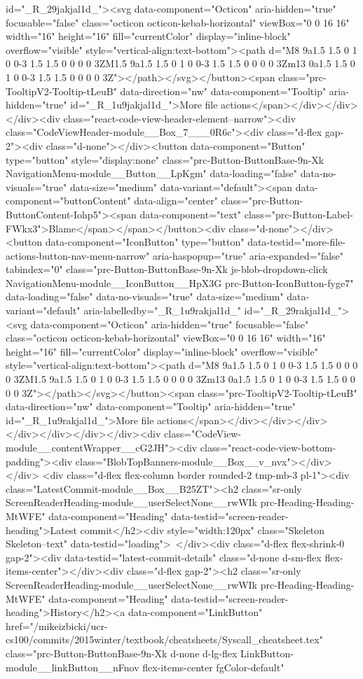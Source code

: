 {{{{{id="_R_29jakjal1d_"><svg data-component="Octicon" aria-hidden="true" focusable="false" class="octicon octicon-kebab-horizontal" viewBox="0 0 16 16" width="16" height="16" fill="currentColor" display="inline-block" overflow="visible" style="vertical-align:text-bottom"><path d="M8 9a1.5 1.5 0 1 0 0-3 1.5 1.5 0 0 0 0 3ZM1.5 9a1.5 1.5 0 1 0 0-3 1.5 1.5 0 0 0 0 3Zm13 0a1.5 1.5 0 1 0 0-3 1.5 1.5 0 0 0 0 3Z"></path></svg></button><span class="prc-TooltipV2-Tooltip-tLeuB" data-direction="nw" data-component="Tooltip" aria-hidden="true" id="_R_1u9jakjal1d_">More file actions</span></div></div></div><div class="react-code-view-header-element--narrow"><div class="CodeViewHeader-module__Box_7___0R6c"><div class="d-flex gap-2"><div class="d-none"></div><button data-component="Button" type="button" style="display:none" class="prc-Button-ButtonBase-9n-Xk NavigationMenu-module__Button__LpKgm" data-loading="false" data-no-visuals="true" data-size="medium" data-variant="default"><span data-component="buttonContent" data-align="center" class="prc-Button-ButtonContent-Iohp5"><span data-component="text" class="prc-Button-Label-FWkx3">Blame</span></span></button><div class="d-none"></div><button data-component="IconButton" type="button" data-testid="more-file-actions-button-nav-menu-narrow" aria-haspopup="true" aria-expanded="false" tabindex="0" class="prc-Button-ButtonBase-9n-Xk js-blob-dropdown-click NavigationMenu-module__IconButton__HpX3G prc-Button-IconButton-fyge7" data-loading="false" data-no-visuals="true" data-size="medium" data-variant="default" aria-labelledby="_R_1u9rakjal1d_" id="_R_29rakjal1d_"><svg data-component="Octicon" aria-hidden="true" focusable="false" class="octicon octicon-kebab-horizontal" viewBox="0 0 16 16" width="16" height="16" fill="currentColor" display="inline-block" overflow="visible" style="vertical-align:text-bottom"><path d="M8 9a1.5 1.5 0 1 0 0-3 1.5 1.5 0 0 0 0 3ZM1.5 9a1.5 1.5 0 1 0 0-3 1.5 1.5 0 0 0 0 3Zm13 0a1.5 1.5 0 1 0 0-3 1.5 1.5 0 0 0 0 3Z"></path></svg></button><span class="prc-TooltipV2-Tooltip-tLeuB" data-direction="nw" data-component="Tooltip" aria-hidden="true" id="_R_1u9rakjal1d_">More file actions</span></div></div></div></div></div></div></div><div class="CodeView-module__contentWrapper__cG2JH"><div class="react-code-view-bottom-padding"><div class="BlobTopBanners-module__Box__v_nvx"></div></div> <div class="d-flex flex-column border rounded-2 tmp-mb-3 pl-1"><div class="LatestCommit-module__Box__B25ZT"><h2 class="sr-only ScreenReaderHeading-module__userSelectNone__rwWIk prc-Heading-Heading-MtWFE" data-component="Heading" data-testid="screen-reader-heading">Latest commit</h2><div style="width:120px" class="Skeleton Skeleton--text" data-testid="loading"> </div><div class="d-flex flex-shrink-0 gap-2"><div data-testid="latest-commit-details" class="d-none d-sm-flex flex-items-center"></div><div class="d-flex gap-2"><h2 class="sr-only ScreenReaderHeading-module__userSelectNone__rwWIk prc-Heading-Heading-MtWFE" data-component="Heading" data-testid="screen-reader-heading">History</h2><a data-component="LinkButton" href="/mikeizbicki/ucr-cs100/commits/2015winter/textbook/cheatsheets/Syscall_cheatsheet.tex" class="prc-Button-ButtonBase-9n-Xk d-none d-lg-flex LinkButton-module__linkButton__nFnov flex-items-center fgColor-default" }}}}}
